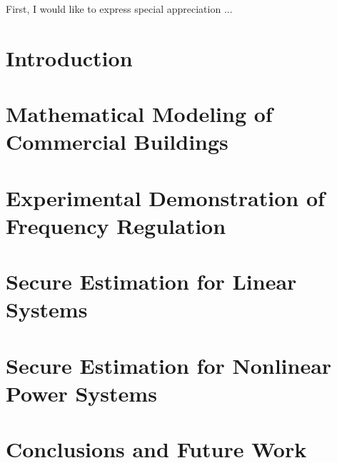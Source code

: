 \documentclass[12pt, oneside, final]{lib/ucthesis}
\def\ssp{\def\baselinestretch{1.0}\large\normalsize}
\begin{document}
\tableofcontents

\begin{acknowledgements}
\thispagestyle{plain}

First, I would like to express special appreciation ...

\end{acknowledgements}




\begin{dissertationText}
\chapter{Introduction \label{chapter:intro}}
%	
%	
\chapter{Mathematical Modeling of Commercial Buildings \label{chapter:building_model}}
	
\chapter{Experimental Demonstration of Frequency Regulation \label{chapter:building_exp}}
	
\chapter{Secure Estimation for Linear Systems \label{chapter:se_linear}}
	
\chapter{Secure Estimation for Nonlinear Power Systems \label{chapter:se_nonlinear}}
	
\chapter{Conclusions and Future Work \label{chapter:conclusions}}
%  



\ssp	%



%	

\end{dissertationText}
\end{document}
